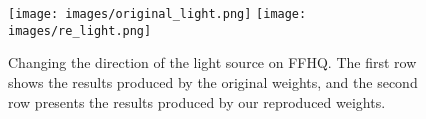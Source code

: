 




\begin{figure}[t]
    \centering
    \texttt{[image: images/original\_light.png]}
    \texttt{[image: images/re\_light.png]}
    \caption{Changing the direction of the light source on FFHQ. The first row shows the results produced by the original weights, and the second row presents the results produced by our reproduced weights.}
    \label{fig:lighting}
\end{figure}




